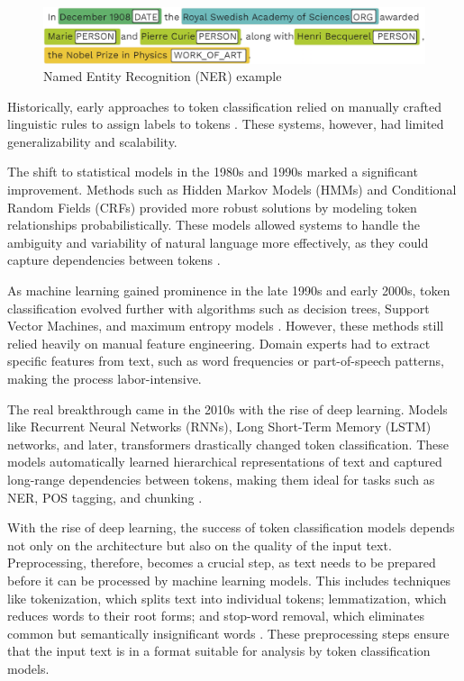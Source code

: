 \documentclass{Configuration_Files/PoliMi3i_thesis}
\begin{document}
\begin{figure}[h!] 
\centering 
\includegraphics[width=0.85\linewidth,height=0.09\textheight]{Images/ner_example.png} 
\caption{Named Entity Recognition (NER) example} 
\label{ner_example} 
\end{figure} 
\FloatBarrier

Historically, early approaches to token classification relied on manually crafted linguistic rules to assign labels to tokens \cite{teller2000speech}. These systems, however, had limited generalizability and scalability. 

The shift to statistical models in the 1980s and 1990s marked a significant improvement. Methods such as Hidden Markov Models (HMMs) and Conditional Random Fields (CRFs) provided more robust solutions by modeling token relationships probabilistically. These models allowed systems to handle the ambiguity and variability of natural language more effectively, as they could capture dependencies between tokens \cite{rabiner1989tutorial, lafferty2001conditional}.

As machine learning gained prominence in the late 1990s and early 2000s, token classification evolved further with algorithms such as decision trees, Support Vector Machines, and maximum entropy models \cite{ratnaparkhi1996maximum}. However, these methods still relied heavily on manual feature engineering. Domain experts had to extract specific features from text, such as word frequencies or part-of-speech patterns, making the process labor-intensive.

The real breakthrough came in the 2010s with the rise of deep learning. Models like Recurrent Neural Networks (RNNs), Long Short-Term Memory (LSTM) networks, and later, transformers drastically changed token classification. 
These models automatically learned hierarchical representations of text and captured long-range dependencies between tokens, making them ideal for tasks such as NER, POS tagging, and chunking \cite{sherstinsky2020fundamentals}.

With the rise of deep learning, the success of token classification models depends not only on the architecture but also on the quality of the input text. Preprocessing, therefore, becomes a crucial step, as text needs to be prepared before it can be processed by machine learning models. This includes techniques like tokenization, which splits text into individual tokens; lemmatization, which reduces words to their root forms; and stop-word removal, which eliminates common but semantically insignificant words \cite{jurafskyspeech}. These preprocessing steps ensure that the input text is in a format suitable for analysis by token classification models. 
\end{document}
